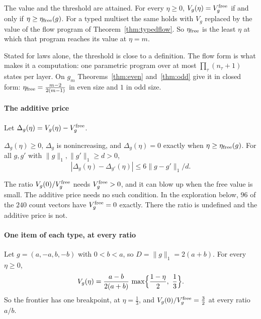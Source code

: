 \begin{theorem}
\label{thm:freeband}
The value and the threshold are attained. For every $\eta\ge0$,
$V_g(\eta)=V^{\rm free}_g$ if and only if $\eta\ge\eta_{\rm free}(g)$. For a typed multiset
the same holds with $V_g$ replaced by the value of the flow program of
Theorem~\ref{thm:typedflow}. So $\eta_{\rm free}$ is the least $\eta$ at which that program
reaches its value at $\eta=m$.
\end{theorem}

Stated for laws alone, the threshold is close to a definition. The flow form is what makes it a
computation: one parametric program over at most $\prod_\tau(n_\tau+1)$ states per layer. On
$g_m$ Theorems~\ref{thm:even} and~\ref{thm:odd} give it in closed form:
$\eta_{\rm free}=\frac{m-2}{2(m-1)}$ in even size and $1$ in odd size.

\paragraph{The additive price} Let $\Delta_g(\eta)=V_g(\eta)-V^{\rm free}_g$.

\begin{proposition}
\label{prop:gap}
$\Delta_g(\eta)\ge0$, $\Delta_g$ is nonincreasing, and $\Delta_g(\eta)=0$ exactly when
$\eta\ge\eta_{\rm free}(g)$. For all $g,g'$ with $\|g\|_1,\|g'\|_1\ge d>0$,
\[
|\Delta_g(\eta)-\Delta_{g'}(\eta)|\le6\|g-g'\|_1/d.
\]
\end{proposition}

The ratio $V_g(0)/V^{\rm free}_g$ needs $V^{\rm free}_g>0$, and it can blow up when the free
value is small. The additive price needs no such condition. In the exploration below, $96$ of the
$240$ count vectors have $V^{\rm free}_g=0$ exactly. There the ratio is undefined and the
additive price is not.

\paragraph{One item of each type, at every ratio}
\begin{theorem}
\label{thm:twomag}
Let $g=(a,-a,b,-b)$ with $0<b<a$, so $D=\|g\|_1=2(a+b)$. For every $\eta\ge0$,
\[
V_g(\eta)=\frac{a-b}{2(a+b)}\,\max\Bigl\{\frac{1-\eta}2,\ \frac13\Bigr\}.
\]
So the frontier has one breakpoint, at $\eta=\frac13$, and $V_g(0)/V_g^{\rm free}=\frac32$ at
every ratio $a/b$.
\end{theorem}

